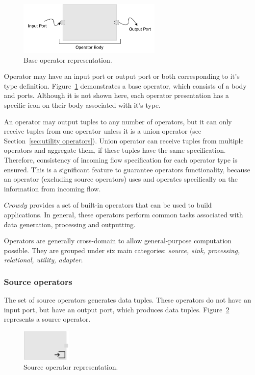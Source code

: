 \begin{figure}[ht]
	\centering
	\includegraphics[height=100px]{figures/basicoperator.pdf}
	\caption{Base operator representation.}
	\label{fig:basic operator}
\end{figure}

Operator may have an input port or output port or both corresponding to it's type 
definition. Figure~\ref{fig:basic operator} demonstrates a base operator, which 
consists of a body and ports. Although it is not shown here, each operator presentation 
has a specific icon on their body associated with it's type.

An operator may output tuples to any number of operators, but it can only receive 
tuples from one operator unless it is a union operator (see Section~\ref{sec:utility operators}). 
Union operator can receive tuples from multiple operators and aggregate them,
if these tuples have the same specification. Therefore, consistency of incoming flow 
specification for each operator type is ensured. 
This is a significant feature to guarantee operators functionality, because an operator 
(excluding source operators) uses and operates specifically on the 
information from incoming flow.

$Crowdy$ provides a set of built-in operators that can be used to build applications. 
In general, these operators perform common tasks associated with data generation, 
processing and outputting.

Operators are generally cross-domain to allow general-purpose 
computation possible. They are grouped under six main categories: 
\textit{source, sink, processing, relational, utility, adapter}.

\subsubsection{Source operators}
The set of source operators generates data tuples. These operators do not have 
an input port, but have an output port, which produces data tuples. Figure~\ref{fig:source operator} 
represents a source operator.

\begin{figure}[ht]
	\centering
	\includegraphics[height=60px]{figures/SourceOperator.pdf}
	\caption{Source operator representation.}
	\label{fig:source operator}
\end{figure}


